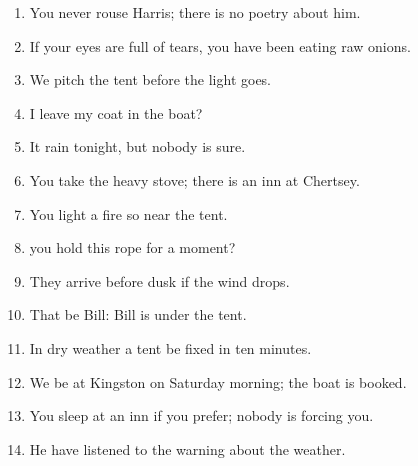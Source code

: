\documentclass{fiche}
\begin{document}
\entete





\begin{anglais}
\begin{enumerate}[label=\arabic*.,itemsep=2.2mm,leftmargin=*]
  \item You  never rouse Harris; there is no poetry about him.
  \item If your eyes are full of tears, you  have been eating raw onions.
  \item We  pitch the tent before the light goes.
  \item {} I leave my coat in the boat?
  \item It  rain tonight, but nobody is sure.
  \item You  take the heavy stove; there is an inn at Chertsey.
  \item You  light a fire so near the tent.
  \item {} you hold this rope for a moment?
  \item They  arrive before dusk if the wind drops.
  \item That  be Bill: Bill is under the tent.
  \item In dry weather a tent  be fixed in ten minutes.
  \item We  be at Kingston on Saturday morning; the boat is booked.
  \item You  sleep at an inn if you prefer; nobody is forcing you.
  \item He  have listened to the warning about the weather.
\end{enumerate}
\end{anglais}
\end{document}
